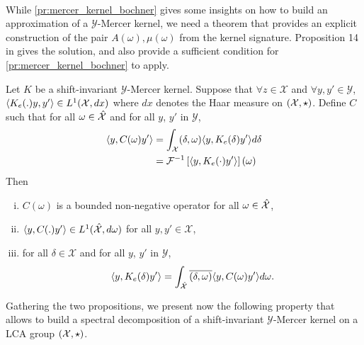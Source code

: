\paragraph{}
While \cref{pr:mercer_kernel_bochner} gives some insights on how to build an approximation of a $\mathcal{Y}$-Mercer kernel, we need a theorem that provides an explicit construction of the pair $A(\omega), \mu(\omega)$ from the kernel signature. Proposition 14 in \citet{Carmeli2010} gives the solution, and also provide a sufficient condition for \cref{pr:mercer_kernel_bochner} to apply.
\begin{proposition}
\label{pr:inverse_ovk_Fourier_decomposition}
Let $K$ be a shift-invariant $\mathcal{Y}$-Mercer kernel. %
Suppose that $\forall z \in \mathcal{X}$ and $\forall y ,y' \in\mathcal{Y}$, $\langle K_e(.)y,y'\rangle\in L^1(\mathcal{X},dx)$ where $dx$ denotes the Haar measure on $(\mathcal{X}, \star)$. %
Define $C$ such that for all $\omega \in \hat{\mathcal{X}}$ and for all $y$, $y'$ in $\mathcal{Y}$,
\begin{equation}\label{eq:CK0}
\begin{aligned}
\langle y,C(\omega)y'\rangle &= \int_{\mathcal{X}} (\delta, \omega)\langle y, K_e(\delta)y'\rangle d\delta \\
	&=\mathcal{F}^{-1}\left[\langle y, K_e(\cdot)y'\rangle\right](\omega)
\end{aligned}
\end{equation}
Then
\begin{enumerate}[i)]
\item $C(\omega)$ is a bounded non-negative operator for all $\omega \in \hat{\mathcal{X}}$,
\item $\langle y, C(.)y'\rangle\in L^1(\hat{\mathcal{X}},d\omega)$ for all $y,y'\in\mathcal{X}$,
\item for all $\delta\in\mathcal{X}$ and for all $y$, $y'$ in $\mathcal{Y}$,
\begin{equation*}
\langle y, K_e(\delta)y'\rangle= \int_{\hat{\mathcal{X}}}\overline{(\delta,\omega)}\langle y, C(\omega)y'\rangle d\omega.
\end{equation*}
\end{enumerate}
\end{proposition}
Gathering the two propositions, we present now the following property that allows to build a spectral decomposition of a shift-invariant $\mathcal{Y}$-Mercer kernel on a \acs{LCA} group $(\mathcal{X},\star)$.
